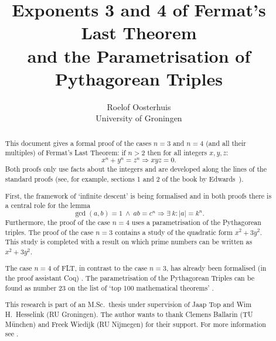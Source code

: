 \documentclass[11pt,a4paper,twoside]{article}
\begin{document}
\title{Exponents 3 and 4 of Fermat's Last Theorem \\ and the Parametrisation of Pythagorean Triples}
\author{Roelof Oosterhuis\\University of Groningen}
\maketitle

\begin{abstract}
This document gives a formal proof of the cases $n=3$ and $n=4$ (and
all their multiples) of Fermat's Last Theorem: if $n>2$ then for all
integers $x,y,z$:
\[ x^n + y^n = z^n \Longrightarrow xyz=0.\]
Both proofs only use facts about the integers and are developed along
the lines of the standard proofs (see, for example, sections 1 and 2
of the book by Edwards~\cite{Edwards}).

First, the framework of `infinite descent' is being formalised and in
both proofs there is a central role for the lemma
\[ \gcd(a,b)=1 ~\land~ ab=c^n \Longrightarrow \exists ~k: |a| =k^n. \]
Furthermore, the proof of the case $n=4$ uses a parametrisation of the
Pythagorean triples. The proof of the case $n=3$ contains a study of
the quadratic form $x^2 + 3y^2$. This study is completed with a result
on which prime numbers can be written as $x^2+3y^2$.

The case $n=4$ of FLT, in contrast to the case $n=3$, has already been
formalised (in the proof assistant Coq) \cite{DelahayeM}. The
parametrisation of the Pythagorean Triples can be found as number 23
on the list of `top 100 mathematical theorems' \cite{Wiedijk100}.

This research is part of an M.Sc.~thesis under supervision of Jaap Top
and Wim H.~Hesselink (RU Groningen). The author wants to thank Clemens
Ballarin (TU M\"unchen) and Freek Wiedijk (RU Nijmegen) for their
support. For more information see \cite{Oosterhuis-MSc}.
\end{abstract}
\thispagestyle{empty}
\clearpage

\tableofcontents
{}

\clearpage






\end{document}
